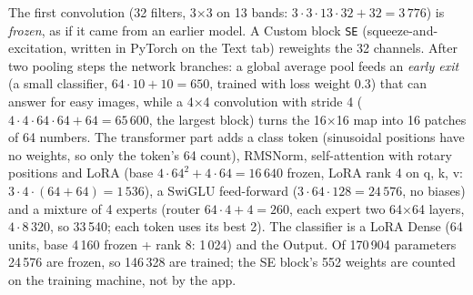 The first convolution (32 filters, 3$\times$3 on 13 bands: $3\cdot 3\cdot 13\cdot 32+32=3\,776$) is \emph{frozen}, as if it came from an earlier model. A Custom block \texttt{SE} (squeeze-and-excitation, written in PyTorch on the Text tab) reweights the 32 channels. After two pooling steps the network branches: a global average pool feeds an \emph{early exit} (a small classifier, $64\cdot 10+10=650$, trained with loss weight 0.3) that can answer for easy images, while a 4$\times$4 convolution with stride 4 ($4\cdot4\cdot64\cdot64+64=65\,600$, the largest block) turns the 16$\times$16 map into 16 patches of 64 numbers. The transformer part adds a class token (sinusoidal positions have no weights, so only the token's 64 count), RMSNorm, self-attention with rotary positions and LoRA (base $4\cdot64^2+4\cdot64=16\,640$ frozen, LoRA rank 4 on q, k, v: $3\cdot4\cdot(64+64)=1\,536$), a SwiGLU feed-forward ($3\cdot 64\cdot 128=24\,576$, no biases) and a mixture of 4 experts (router $64\cdot4+4=260$, each expert two 64$\times$64 layers, $4\cdot 8\,320$, so 33\,540; each token uses its best 2). The classifier is a LoRA Dense (64 units, base 4\,160 frozen + rank 8: 1\,024) and the Output. Of 170\,904 parameters 24\,576 are frozen, so 146\,328 are trained; the SE block's 552 weights are counted on the training machine, not by the app.

